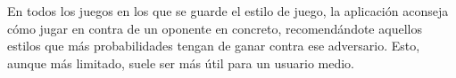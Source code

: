 En todos los juegos en los que se guarde el estilo de juego, la aplicación aconseja cómo jugar en contra de un oponente en concreto, recomendándote aquellos estilos que más probabilidades tengan de ganar contra ese adversario. Esto, aunque más limitado, suele ser más útil para un usuario medio.
